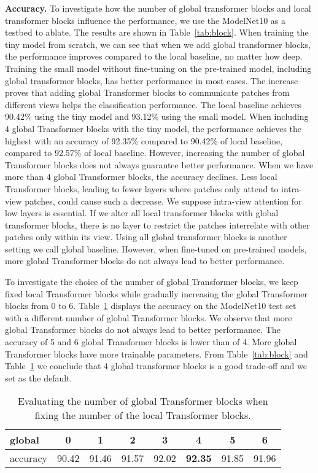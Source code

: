 \documentclass{bmvc2k}
\begin{document}
\vspace{0.1in}
\noindent \textbf{Accuracy.} To investigate how the number of global transformer blocks and local transformer blocks influence the performance, we use the ModelNet10 as a testbed to ablate. The results are shown in Table~\ref{tab:block}. When training the tiny model from scratch, we can see that when we add global transformer blocks, the performance improves compared to the local baseline, no matter how deep. Training the small model without fine-tuning on the pre-trained model, including global transformer blocks, has better performance in most cases. The increase proves that adding global Transformer blocks to communicate patches from different views helps the classification performance. The local baseline achieves 90.42\% using the tiny model and 93.12\% using the small model. When including 4 global Transformer blocks with the tiny model, the performance achieves the highest with an accuracy of 92.35\%  compared to 90.42\% of local baseline,  compared to 92.57\% of local baseline. However, increasing the number of global Transformer blocks does not always guarantee better performance. When we have more than 4 global Transformer blocks, the accuracy declines. Less local Transformer blocks, leading to fewer layers where patches only attend to intra-view patches, could cause such a decrease. We suppose intra-view attention for low layers is essential. If we alter all local transformer blocks with global transformer blocks, there is no layer to restrict the patches interrelate with other patches only within its view. Using all global transformer blocks is another setting we call global baseline. 
However, when fine-tuned on pre-trained models, more global Transformer blocks do not always lead to better performance.

To investigate the choice of the number of global Transformer blocks, we keep fixed local Transformer blocks while gradually increasing the global Transformer blocks from 0 to 6. Table~\ref{tab:fixed} displays the accuracy on the ModelNet10 test set with a different number of global Transformer blocks. We observe that more global Transformer blocks do not always lead to better performance. The accuracy of 5 and 6 global Transformer blocks is lower than of 4. More global Transformer blocks have more trainable parameters.
From Table~\ref{tab:block} and Table~\ref{tab:fixed} we conclude that 4 global transformer blocks is a good trade-off and we set as the default.

\begin{table}[htp]
\centering
\begin{tabular}{lccccccc}
\toprule
global & 0 & 1 & 2 & 3 & 4 & 5 & 6 \\
\midrule
accuracy & 90.42 & 91.46 & 91.57 & 92.02 & \textbf{92.35} & 91.85 & 91.96 \\
\bottomrule
\end{tabular}

\vspace{0.1in}
\caption{
    Evaluating the number of global Transformer blocks when fixing the number of the local Transformer blocks.
}
\label{tab:fixed}
\end{table}
\end{document}
